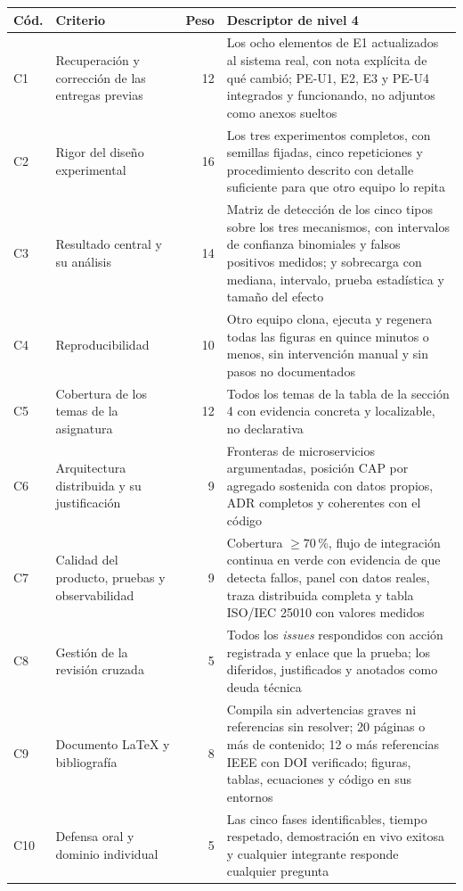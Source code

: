 \documentclass[11pt,a4paper]{article}
\begin{document}
	\begin{center}
		\footnotesize
		\begin{longtable}{@{}p{0.8cm}p{5.2cm}rp{7.4cm}@{}}
			\toprule
			\textbf{Cód.} & \textbf{Criterio} & \textbf{Peso} & \textbf{Descriptor de nivel 4} \\
			\midrule
			\endhead
			C1 & Recuperación y corrección de las entregas previas & 12 & Los ocho elementos de E1 actualizados al sistema real, con nota explícita de qué cambió; PE-U1, E2, E3 y PE-U4 integrados y funcionando, no adjuntos como anexos sueltos \\
			\addlinespace
			C2 & Rigor del diseño experimental & 16 & Los tres experimentos completos, con semillas fijadas, cinco repeticiones y procedimiento descrito con detalle suficiente para que otro equipo lo repita \\
			\addlinespace
			C3 & Resultado central y su análisis & 14 & Matriz de detección de los cinco tipos sobre los tres mecanismos, con intervalos de confianza binomiales y falsos positivos medidos; y sobrecarga con mediana, intervalo, prueba estadística y tamaño del efecto \\
			\addlinespace
			C4 & Reproducibilidad & 10 & Otro equipo clona, ejecuta y regenera todas las figuras en quince minutos o menos, sin intervención manual y sin pasos no documentados \\
			\addlinespace
			C5 & Cobertura de los temas de la asignatura & 12 & Todos los temas de la tabla de la sección 4 con evidencia concreta y localizable, no declarativa \\
			\addlinespace
			C6 & Arquitectura distribuida y su justificación & 9 & Fronteras de microservicios argumentadas, posición CAP por agregado sostenida con datos propios, ADR completos y coherentes con el código \\
			\addlinespace
			C7 & Calidad del producto, pruebas y observabilidad & 9 & Cobertura $\geq 70\,\%$, flujo de integración continua en verde con evidencia de que detecta fallos, panel con datos reales, traza distribuida completa y tabla ISO/IEC 25010 con valores medidos \\
			\addlinespace
			C8 & Gestión de la revisión cruzada & 5 & Todos los \emph{issues} respondidos con acción registrada y enlace que la prueba; los diferidos, justificados y anotados como deuda técnica \\
			\addlinespace
			C9 & Documento LaTeX y bibliografía & 8 & Compila sin advertencias graves ni referencias sin resolver; 20 páginas o más de contenido; 12 o más referencias IEEE con DOI verificado; figuras, tablas, ecuaciones y código en sus entornos \\
			\addlinespace
			C10 & Defensa oral y dominio individual & 5 & Las cinco fases identificables, tiempo respetado, demostración en vivo exitosa y cualquier integrante responde cualquier pregunta \\
			\bottomrule
		\end{longtable}
	\end{center}
	
\end{document}
